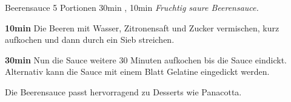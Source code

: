 \documentclass[../recipe-collections/cooking.tex]{subfiles}
\begin{document}
\begin{recipe}{Beerensauce} {5 Portionen } {30min , 10min }
  \freeform{}\textit{Fruchtig saure Beerensauce.}


  \textbf{10min}
  Die Beeren mit Wasser, Zitronensaft und Zucker vermischen, kurz aufkochen und dann durch ein Sieb streichen.

  \newstep{}\textbf{30min}
  Nun die Sauce weitere 30 Minuten aufkochen bis die Sauce eindickt.
  Alternativ kann die Sauce mit einem Blatt Gelatine eingedickt werden.

  \freeform{}\hrulefill{}

  \freeform{}
  Die Beerensauce passt hervorragend zu Desserts wie Panacotta.

\end{recipe}
\end{document}
